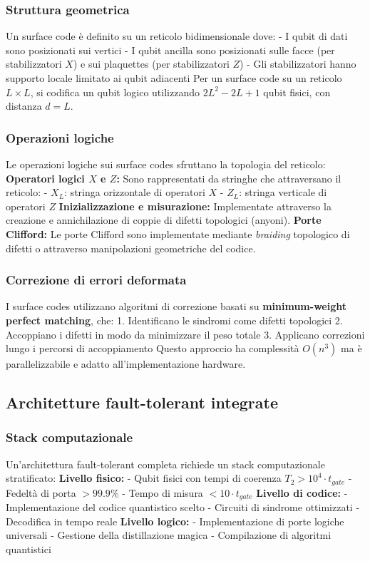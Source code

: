\documentclass[a4paper,12pt]{report}
\theoremstyle{plain}
\begin{document}
\subsubsection{Struttura geometrica}
Un surface code è definito su un reticolo bidimensionale dove:
- I qubit di dati sono posizionati sui vertici
- I qubit ancilla sono posizionati sulle facce (per stabilizzatori $X$) e sui plaquettes (per stabilizzatori $Z$)
- Gli stabilizzatori hanno supporto locale limitato ai qubit adiacenti
Per un surface code su un reticolo $L \times L$, si codifica un qubit logico utilizzando $2L^2 - 2L + 1$ qubit fisici, con distanza $d = L$.
\subsubsection{Operazioni logiche}
Le operazioni logiche sui surface codes sfruttano la topologia del reticolo:
\textbf{Operatori logici $X$ e $Z$:}
Sono rappresentati da stringhe che attraversano il reticolo:
- $X_L$: stringa orizzontale di operatori $X$
- $Z_L$: stringa verticale di operatori $Z$
\textbf{Inizializzazione e misurazione:}
Implementate attraverso la creazione e annichilazione di coppie di difetti topologici (anyoni).
\textbf{Porte Clifford:}
Le porte Clifford sono implementate mediante \textit{braiding} topologico di difetti o attraverso manipolazioni geometriche del codice.
\subsubsection{Correzione di errori deformata}
I surface codes utilizzano algoritmi di correzione basati su \textbf{minimum-weight perfect matching}, che:
1. Identificano le sindromi come difetti topologici
2. Accoppiano i difetti in modo da minimizzare il peso totale
3. Applicano correzioni lungo i percorsi di accoppiamento
Questo approccio ha complessità $O(n^3)$ ma è parallelizzabile e adatto all'implementazione hardware.
\subsection{Architetture fault-tolerant integrate}
\subsubsection{Stack computazionale}
Un'architettura fault-tolerant completa richiede un stack computazionale stratificato:
\textbf{Livello fisico:}
- Qubit fisici con tempi di coerenza $T_2 > 10^4 \cdot t_{gate}$
- Fedeltà di porta $> 99.9\%$
- Tempo di misura $< 10 \cdot t_{gate}$
\textbf{Livello di codice:}
- Implementazione del codice quantistico scelto
- Circuiti di sindrome ottimizzati
- Decodifica in tempo reale
\textbf{Livello logico:}
- Implementazione di porte logiche universali
- Gestione della distillazione magica
- Compilazione di algoritmi quantistici
\end{document}
